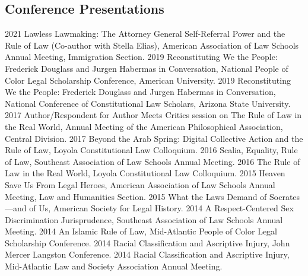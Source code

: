 \documentclass[letterpaper]{moderncv}
\begin{document}
\subsection{Conference Presentations}
\cvitem
{2021}
{Lawless Lawmaking: The Attorney General Self-Referral Power and the Rule of Law (Co-author with Stella Elias), American Association of Law Schools Annual Meeting, Immigration Section.}
\vspace{1mm}
\cvitem
{2019}
{Reconstituting We the People: Frederick Douglass and Jurgen Habermas in Conversation, National People of Color Legal Scholarship Conference, American University.}
\vspace{1mm}
\cvitem
{2019}
{Reconstituting We the People: Frederick Douglass and Jurgen Habermas in Conversation, National Conference of Constitutional Law Scholars, Arizona State University.}
\vspace{1mm}
\cvitem
{2017}
{Author/Respondent for Author Meets Critics session on The Rule of Law in the Real World, Annual Meeting of the American Philosophical Association, Central Division.}
\vspace{1mm}
\cvitem
{2017}
{Beyond the Arab Spring: Digital Collective Action and the Rule of Law, Loyola Constitutional Law Colloquium.}
\vspace{1mm}
\cvitem
{2016}
{Scalia, Equality, Rule of Law, Southeast Association of Law Schools Annual Meeting.}
\vspace{1mm}
\cvitem
{2016}
{The Rule of Law in the Real World, Loyola Constitutional Law Colloquium.}
\vspace{1mm}
\cvitem
{2015}
{Heaven Save Us From Legal Heroes, American Association of Law Schools Annual Meeting, Law and Humanities Section.}
\vspace{1mm}
\cvitem
{2015}
{What the Laws Demand of Socrates---and of Us, American Society for Legal History.}
\vspace{1mm}
\cvitem
{2014}
{A Respect-Centered Sex Discrimination Jurisprudence, Southeast Association of Law Schools Annual Meeting.}
\vspace{1mm}
\cvitem
{2014}
{An Islamic Rule of Law, Mid-Atlantic People of Color Legal Scholarship Conference.}
\vspace{1mm}
\cvitem
{2014}
{Racial Classification and Ascriptive Injury, John Mercer Langston Conference.}
\vspace{1mm}
\cvitem
{2014}
{Racial Classification and Ascriptive Injury, Mid-Atlantic Law and Society Association Annual Meeting.}
\vspace{1mm}
\end{document}
